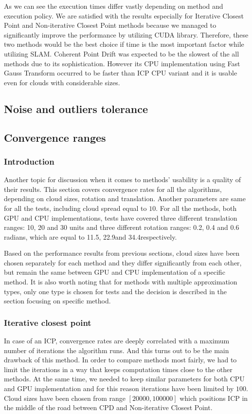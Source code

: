 \documentclass[titlepage]{article}
\begin{document}
As we can see the execution times differ vastly depending on method and execution policy. We are satisfied with the results especially for Iterative Closest Point and Non-iterative Closest Point methods because we managed to significantly improve the performance by utilizing CUDA library. Therefore, these two methods would be the best choice if time is the most important factor while utilizing SLAM. Coherent Point Drift was expected to be the slowest of the all methods due to its sophistication. However its CPU implementation using Fast Gauss Transform occurred to be faster than ICP CPU variant and it is usable even for clouds with considerable sizes.

\subsection{Noise and outliers tolerance}

\subsection{Convergence ranges}

\subsubsection{Introduction}
Another topic for discussion when it comes to methods' usability is a quality of their results. This section covers convergence rates for all the algorithms, depending on cloud sizes, rotation and translation. Another parameters are same for all the tests, including cloud spread equal to $10$. For all the methods, both GPU and CPU implementations, tests have covered three different translation ranges: 10, 20 and 30 units and three different rotation ranges: 0.2, 0.4 and 0.6 radians, which are equal to 11.5\degree, 22.9\degree and 34.4\degree respectively.

Based on the performance results from previous sections, cloud sizes have been chosen separately for each method and they differ significantly from each other, but remain the same between GPU and CPU implementation of a specific method. It is also worth noting that for methods with multiple approximation types, only one type is chosen for tests and the decision is described in the section focusing on specific method.

\subsubsection{Iterative closest point}
In case of an ICP, convergence rates are deeply correlated with a maximum number of iterations the algorithm runs. And this turns out to be the main drawback of this method. In order to compare methods most fairly, we had to limit the iterations in a way that keeps computation times close to the other methods. At the same time, we needed to keep similar parameters for both CPU and GPU implementation and for this reason iterations have been limited by $100$. Cloud sizes have been chosen from range $[20000,100000]$ which positions ICP in the middle of the road between CPD and Non-iterative Closest Point.
\end{document}
